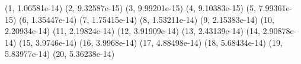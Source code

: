 (1, 1.06581e-14) (2, 9.32587e-15) (3, 9.99201e-15) (4, 9.10383e-15) (5, 7.99361e-15) (6, 1.35447e-14) (7, 1.75415e-14) (8, 1.53211e-14) (9, 2.15383e-14) (10, 2.20934e-14) (11, 2.19824e-14) (12, 3.91909e-14) (13, 2.43139e-14) (14, 2.90878e-14) (15, 3.9746e-14) (16, 3.9968e-14) (17, 4.88498e-14) (18, 5.68434e-14) (19, 5.83977e-14) (20, 5.36238e-14) 